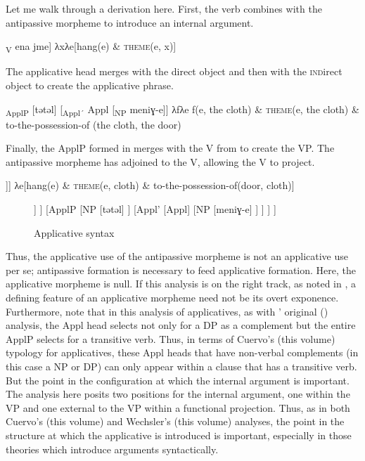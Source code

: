 \documentclass[output=paper,colorlinks,citecolor=brown,nonflat]{./langscibook}
\begin{document}
Let me walk through a derivation here. First, the verb combines with the antipassive morpheme to introduce an internal argument.

\ea%
    \label{ex:basilico:7}
    \ea {[}\textsubscript{V} ena jme{]} 
    \ex λxλe[hang(e) \& \textsc{theme}(e, x)]  
    \z
    \z

The applicative head merges with the direct object and then with the \textsc{ind}irect object to create the applicative phrase.

\ea%
    \label{ex:basilico:8}
    	\ea {[}\textsubscript{ApplP} [tǝtǝl] [\textsubscript{Appl´} Appl [\textsubscript{NP} meniɣ-e]{]}  
    \ex λfλe f(e, the cloth) \& \textsc{theme}(e, the cloth) \& to-the-possession-of (the cloth, the door)
    \z
    \z
 
Finally, the ApplP formed in  merges with the V from  to create the VP. The antipassive morpheme has adjoined to the V, allowing the V to project.

\ea%
    \label{ex:basilico:9}
    	\ea [\textsubscript{VP} [\textsubscript{V} ena jme] [\textsubscript{ApplP} [tǝtǝl] [\textsubscript{Appl´} Appl [\textsubscript{NP} meniɣ-e]]]
    \ex λe[hang(e) \& \textsc{theme}(e, cloth) \& to-the-possession-of(door, cloth)]
    \z
    \z
    
\begin{figure}
	\begin{forest}
	[VP
		[V
			[ena]
			[V
				[jme]
			]
		]
		[ApplP
			[NP
				[tǝtǝl]
			]
			[Appl'
				[Appl]
				[NP
					[meniɣ-e]
				]
			]
		]
	]	
	\end{forest}	
		\caption{\label{fig:basilico:9} Applicative syntax}
\end{figure}                                       

Thus, the applicative use of the antipassive morpheme is not an applicative use per se; antipassive formation is necessary to feed applicative formation. Here, the applicative morpheme is null. If this analysis is on the right track, as noted in , a defining feature of an applicative morpheme need not be its overt exponence. Furthermore, note that in this analysis of applicatives, as with \citeauthor{Pyllkänen2008}' original (\citeyear{Pyllkänen2008}) analysis, the Appl head selects not only for a DP as a complement but the entire ApplP selects for a transitive verb. Thus, in terms of Cuervo’s (this volume) typology for applicatives, these Appl heads that have non-verbal complements (in this case a NP or DP) can only appear within a clause that has a transitive verb. But the point in the configuration at which the internal argument is important. The analysis here posits two positions for the internal argument, one within the VP and one external to the VP within a functional projection. Thus, as in both Cuervo’s (this volume) and Wechsler’s (this volume) analyses, the point in the structure at which the applicative is introduced is important, especially in those theories which introduce arguments syntactically. 
\end{document}
